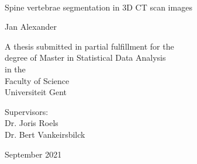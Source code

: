 
%
%
\thispagestyle{empty}

{%
\sffamily
\centering
\Large

~\vspace{\fill}

{\huge 
Spine vertebrae segmentation in 3D CT scan images
}

\vspace{2.5cm}

{\LARGE
Jan Alexander
}

\vspace{3.5cm}

A thesis submitted in partial fulfillment for the\\
degree of Master in Statistical Data Analysis\\[1em]
in the\\[1em]
Faculty of Science\\
Universiteit Gent

\vspace{3.5cm}

Supervisors:\\
Dr. Joris Roels\\
Dr. Bert Vankeirsbilck

\vspace{\fill}

September 2021

}%